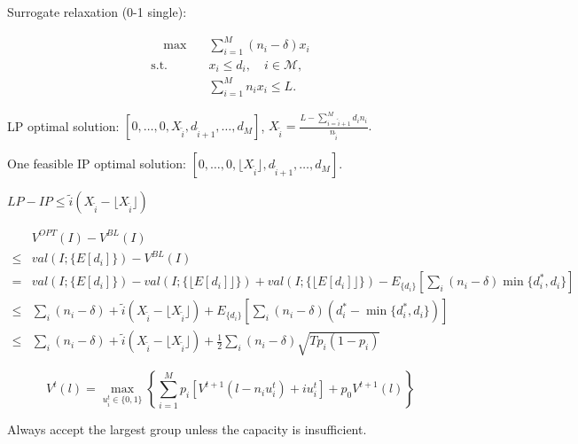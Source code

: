 
Surrogate relaxation (0-1 single):

\begin{align}\label{one_row}
    \quad \max \quad & \sum_{i = 1}^{M} (n_i - \delta) x_{i} \\
    \text {s.t.} \quad & x_{i} \leq d_{i}, \quad i \in \mathcal{M},  \\ 
    & \sum_{i=1}^{M} n_{i} x_{i} \leq L.
\end{align}

LP optimal solution: $[0, \ldots, 0, X_{\tilde{i}}, d_{\tilde{i}+1}, \ldots, d_{M}]$, $X_{\tilde{i}} = \frac{L - \sum_{i = \tilde{i}+1}^{M} {d_i n_i}}{n_{\tilde{i}}}.$

One feasible IP optimal solution: $[0, \ldots, 0, \lfloor X_{\tilde{i}} \rfloor, d_{\tilde{i}+1}, \ldots, d_{M}]$.

$LP - IP \leq \tilde{i} (X_{\tilde{i}} - \lfloor X_{\tilde{i}} \rfloor)$


\begin{align*}
    & V^{OPT}(I) - V^{BL}(I) \\
 \leq & val(I; \{E[d_{i}]\}) - V^{BL}(I) \\
 = & val(I; \{E[d_{i}]\}) - val(I; \{\lfloor E[d_{i}]\rfloor\}) + val(I; \{\lfloor E[d_{i}]\rfloor\}) - E_{\{d_{i}\}}[\sum_{i} (n_{i}-\delta) \min\{d_{i}^{*}, d_{i}\}] \\
 \leq & \sum_{i} (n_{i} - \delta) + \tilde{i} (X_{\tilde{i}} - \lfloor X_{\tilde{i}} \rfloor) + E_{\{d_{i}\}}[\sum_{i} (n_{i}-\delta) (d_{i}^{*} - \min\{d_{i}^{*}, d_{i}\})] \\
 \leq & \sum_{i} (n_{i} - \delta) + \tilde{i} (X_{\tilde{i}} - \lfloor X_{\tilde{i}} \rfloor) + \frac{1}{2} \sum_{i} (n_{i}-\delta) \sqrt{T p_{i} (1- p_{i})}
 \end{align*}
 

\begin{equation}
    V^{t}(l) =  \max_{u_{i}^{t} \in \{0,1\}} \left\{ \sum_{i=1}^{M} p_i \left[V^{t+1}(l-n_i u_{i}^{t})+ i u_{i}^{t}\right] + p_0 V^{t+1}(l)\right\}
\end{equation}

Always accept the largest group unless the capacity is insufficient.

